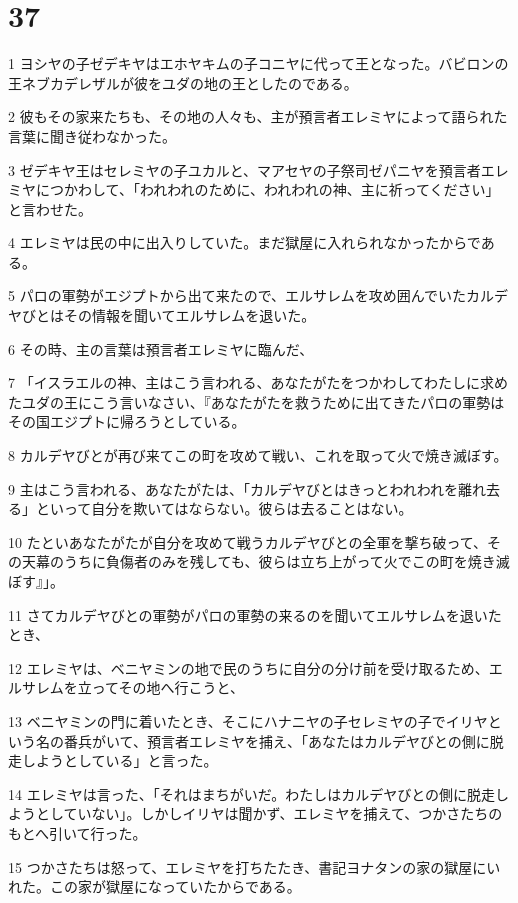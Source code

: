 \chapter{37}

\par 1 ヨシヤの子ゼデキヤはエホヤキムの子コニヤに代って王となった。バビロンの王ネブカデレザルが彼をユダの地の王としたのである。
\par 2 彼もその家来たちも、その地の人々も、主が預言者エレミヤによって語られた言葉に聞き従わなかった。
\par 3 ゼデキヤ王はセレミヤの子ユカルと、マアセヤの子祭司ゼパニヤを預言者エレミヤにつかわして、「われわれのために、われわれの神、主に祈ってください」と言わせた。
\par 4 エレミヤは民の中に出入りしていた。まだ獄屋に入れられなかったからである。
\par 5 パロの軍勢がエジプトから出て来たので、エルサレムを攻め囲んでいたカルデヤびとはその情報を聞いてエルサレムを退いた。
\par 6 その時、主の言葉は預言者エレミヤに臨んだ、
\par 7 「イスラエルの神、主はこう言われる、あなたがたをつかわしてわたしに求めたユダの王にこう言いなさい、『あなたがたを救うために出てきたパロの軍勢はその国エジプトに帰ろうとしている。
\par 8 カルデヤびとが再び来てこの町を攻めて戦い、これを取って火で焼き滅ぼす。
\par 9 主はこう言われる、あなたがたは、「カルデヤびとはきっとわれわれを離れ去る」といって自分を欺いてはならない。彼らは去ることはない。
\par 10 たといあなたがたが自分を攻めて戦うカルデヤびとの全軍を撃ち破って、その天幕のうちに負傷者のみを残しても、彼らは立ち上がって火でこの町を焼き滅ぼす』」。
\par 11 さてカルデヤびとの軍勢がパロの軍勢の来るのを聞いてエルサレムを退いたとき、
\par 12 エレミヤは、ベニヤミンの地で民のうちに自分の分け前を受け取るため、エルサレムを立ってその地へ行こうと、
\par 13 ベニヤミンの門に着いたとき、そこにハナニヤの子セレミヤの子でイリヤという名の番兵がいて、預言者エレミヤを捕え、「あなたはカルデヤびとの側に脱走しようとしている」と言った。
\par 14 エレミヤは言った、「それはまちがいだ。わたしはカルデヤびとの側に脱走しようとしていない」。しかしイリヤは聞かず、エレミヤを捕えて、つかさたちのもとへ引いて行った。
\par 15 つかさたちは怒って、エレミヤを打ちたたき、書記ヨナタンの家の獄屋にいれた。この家が獄屋になっていたからである。
